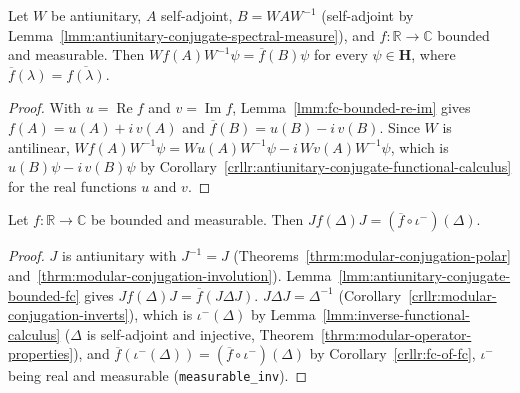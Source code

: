 \begin{lemma}
    \label{lmm:antiunitary-conjugate-bounded-fc}
    \leanok
    Let $W$ be antiunitary, $A$ self-adjoint, $B = WAW^{-1}$ (self-adjoint by Lemma~\ref{lmm:antiunitary-conjugate-spectral-measure}), and $f : \mathbb{R} \to \mathbb{C}$ bounded and measurable. Then $Wf(A)W^{-1}\psi = \overline{f}(B)\psi$ for every $\psi \in \mathbf{H}$, where $\overline{f}(\lambda) = \overline{f(\lambda)}$.
\end{lemma}
\begin{proof}
    \leanok
    With $u = \operatorname{Re} f$ and $v = \operatorname{Im} f$, Lemma~\ref{lmm:fc-bounded-re-im} gives $f(A) = u(A) + i\,v(A)$ and $\overline{f}(B) = u(B) - i\,v(B)$. Since $W$ is antilinear, $Wf(A)W^{-1}\psi = Wu(A)W^{-1}\psi - i\,Wv(A)W^{-1}\psi$, which is $u(B)\psi - i\,v(B)\psi$ by Corollary~\ref{crllr:antiunitary-conjugate-functional-calculus} for the real functions $u$ and $v$.
\end{proof}

\begin{lemma}
    \label{lmm:modular-conjugation-bounded-fc}
    \leanok
    Let $f : \mathbb{R} \to \mathbb{C}$ be bounded and measurable. Then $Jf(\Delta)J = (\overline{f} \circ \iota^-)(\Delta)$.
\end{lemma}
\begin{proof}
    \leanok
    $J$ is antiunitary with $J^{-1} = J$ (Theorems~\ref{thrm:modular-conjugation-polar} and~\ref{thrm:modular-conjugation-involution}). Lemma~\ref{lmm:antiunitary-conjugate-bounded-fc} gives $Jf(\Delta)J = \overline{f}(J\Delta J)$. $J\Delta J = \Delta^{-1}$ (Corollary~\ref{crllr:modular-conjugation-inverts}), which is $\iota^-(\Delta)$ by Lemma~\ref{lmm:inverse-functional-calculus} ($\Delta$ is self-adjoint and injective, Theorem~\ref{thrm:modular-operator-properties}), and $\overline{f}(\iota^-(\Delta)) = (\overline{f} \circ \iota^-)(\Delta)$ by Corollary~\ref{crllr:fc-of-fc}, $\iota^-$ being real and measurable (\texttt{measurable\_inv}).
\end{proof}

